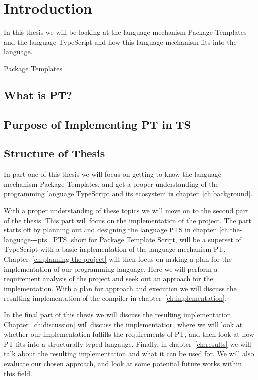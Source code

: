
\chapter{Introduction}\label{ch:introduction}

In this thesis we will be looking at the language mechanism Package Templates and the language TypeScript and how this language mechanism fits into the language.

Package Templates

\section{What is PT?}\label{sec:what-is-pt?}


\section{Purpose of Implementing PT in TS}\label{sec:purpose-of-implementing-pt-in-ts}


\section{Structure of Thesis}\label{sec:structure-of-thesis}

In part one of this thesis we will focus on getting to know the language mechanism Package Templates, and get a proper understanding of the programming language TypeScript and its ecosystem in chapter~\vref{ch:background}.

With a proper understanding of these topics we will move on to the second part of the thesis.
This part will focus on the implementation of the project.
The part starts off by planning out and designing the language PTS in chapter~\vref{ch:the-language---pts}.
PTS, short for Package Template Script, will be a superset of TypeScript with a basic implementation of the language mechanism PT\@.
Chapter~\vref{ch:planning-the-project} will then focus on making a plan for the implementation of our programming language.
Here we will perform a requirement analysis of the project and seek out an approach for the implementation.
With a plan for approach and execution we will discuss the resulting implementation of the compiler in chapter~\vref{ch:implementation}.

In the final part of this thesis we will discuss the resulting implementation.
Chapter~\vref{ch:discussion} will discuss the implementation, where we will look at whether our implementation fulfills the requirements of PT, and then look at how PT fits into a structurally typed langauge.
Finally, in chapter~\vref{ch:results} we will talk about the resulting implementation and what it can be used for.
We will also evaluate our chosen approach, and look at some potential future works within this field.

